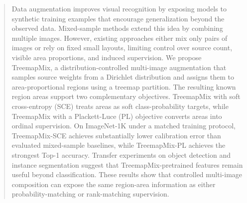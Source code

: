 \begin{abstract}
Data augmentation improves visual recognition by exposing models to synthetic training examples that encourage generalization beyond the observed data. Mixed-sample methods extend this idea by combining multiple images. However, existing approaches either mix only pairs of images or rely on fixed small layouts, limiting control over source count, visible area proportions, and induced supervision. We propose TreemapMix, a distribution-controlled multi-image augmentation that samples source weights from a Dirichlet distribution and assigns them to area-proportional regions using a treemap partition. The resulting known region areas support two complementary objectives. TreemapMix with soft cross-entropy (SCE) treats areas as soft class-probability targets, while TreemapMix with a Plackett-Luce (PL) objective converts areas into ordinal supervision. On ImageNet-1K under a matched training protocol, TreemapMix-SCE achieves substantially lower calibration error than evaluated mixed-sample baselines, while TreemapMix-PL achieves the strongest Top-1 accuracy. Transfer experiments on object detection and instance segmentation suggest that TreemapMix-pretrained features remain useful beyond classification. These results show that controlled multi-image composition can expose the same region-area information as either probability-matching or rank-matching supervision.
\end{abstract}
